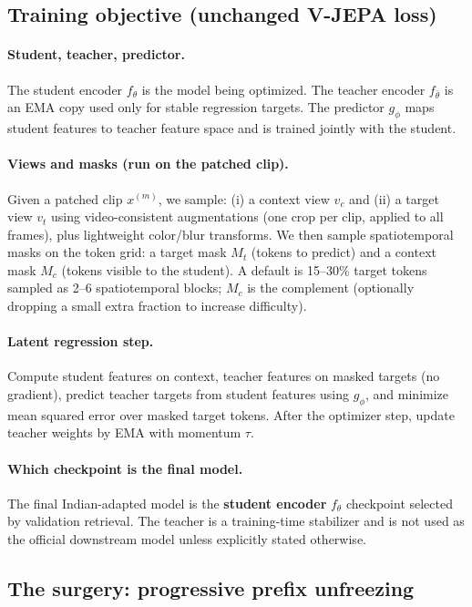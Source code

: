 \subsection{Training objective (unchanged V-JEPA loss)}\label{sec:surgery_objective}
\paragraph{Student, teacher, predictor.} The student encoder $f_\theta$ is the model being optimized. The teacher encoder $f_{\bar{\theta}}$ is an EMA copy used only for stable regression targets. The predictor $g_\phi$ maps student features to teacher feature space and is trained jointly with the student.
\paragraph{Views and masks (run on the patched clip).} Given a patched clip $x^{(m)}$, we sample:
(i) a context view $v_c$ and (ii) a target view $v_t$ using video-consistent augmentations (one crop per clip, applied to all frames), plus lightweight color/blur transforms.
We then sample spatiotemporal masks on the token grid:
a target mask $M_t$ (tokens to predict) and a context mask $M_c$ (tokens visible to the student).
A default is 15--30\% target tokens sampled as 2--6 spatiotemporal blocks; $M_c$ is the complement (optionally dropping a small extra fraction to increase difficulty).
\paragraph{Latent regression step.} Compute student features on context, teacher features on masked targets (no gradient), predict teacher targets from student features using $g_\phi$, and minimize mean squared error over masked target tokens. After the optimizer step, update teacher weights by EMA with momentum $\tau$.
\paragraph{Which checkpoint is the final model.} The final Indian-adapted model is the \textbf{student encoder} $f_\theta$ checkpoint selected by validation retrieval. The teacher is a training-time stabilizer and is not used as the official downstream model unless explicitly stated otherwise.

\subsection{The surgery: progressive prefix unfreezing}\label{sec:surgery_prefix_unfreezing}
